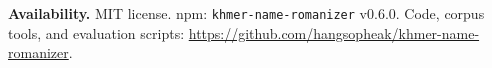 \documentclass[10pt,twocolumn,a4paper]{article}
\begin{document}
{\raggedright\textbf{Availability.} MIT license. npm: \texttt{khmer-name-romanizer}
v0.6.0. Code, corpus tools, and evaluation scripts:
\url{https://github.com/hangsopheak/khmer-name-romanizer}.
\par}

{\small\raggedright


}
\end{document}
